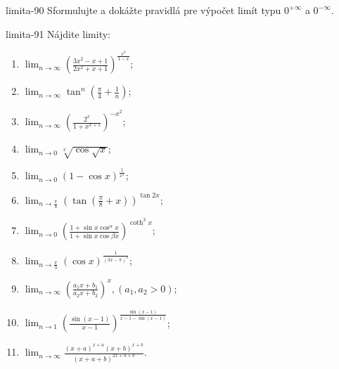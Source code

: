 \begin{defproblem}{limita-90}
Sformulujte a dokážte pravidlá pre výpočet limít typu $0^{+\infty}$ a $0^{-\infty}$.
\end{defproblem}

\begin{defproblem}{limita-91}
Nájdite limity:
\begin{multicols}{2}
\begin{enumerate}
    \item $\lim_{n \rightarrow \infty} (\frac{3x^2-x+1}{2x^2+x+1})^{\frac{x^3}{1-x}}$;
    \item $\lim_{n \rightarrow \infty} \tan ^n (\frac{\pi}{4}+\frac{1}{n})$;
    \item $\lim_{n \rightarrow \infty} (\frac{2^x}{1+x^{x+1}})^{-x^2}$;
    \item $\lim_{n \rightarrow 0} \sqrt[x]{\cos \sqrt{x}}$;
    \item $\lim_{n \rightarrow 0} (1-\cos x)^{\frac{1}{x^2}}$;
    \item $\lim_{n \rightarrow \frac{\pi}{4}} (\tan (\frac{\pi}{8}+x))^{\tan 2x}$;
    \item $\lim_{n \rightarrow 0} (\frac{1+\sin x \cos ^ \alpha x}{1+\sin x \cos \beta x})^{\coth ^3 x}$;
    \item $\lim_{n \rightarrow \frac{\pi}{3}} (\cos x)^{\frac{1}{(3x-\pi)^3}}$;
    \item $\lim_{n \rightarrow \infty} (\frac{a_1x+b_1}{a_2x+b_2})^x,(a_1,a_2>0)$;
    \item $\lim_{n \rightarrow 1} (\frac{\sin (x-1)}{x-1})^{\frac{\sin (x-1)}{x-1-\sin (x-1)}}$;
    \item $\lim_{n \rightarrow \infty} \frac{(x+a)^{x+a}(x+b)^{x+b}}{(x+a+b)^{2x+a+b}}$.
\end{enumerate}
\end{multicols}
\end{defproblem}

